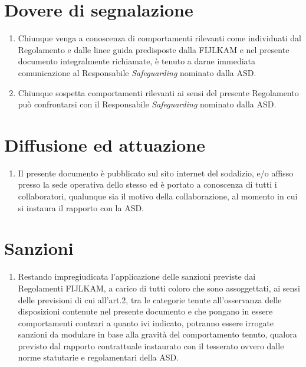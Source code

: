\documentclass{djtsdoc}
\begin{document}
	\section{Dovere di segnalazione}
	\begin{enumerate}
		\item Chiunque venga a conoscenza di comportamenti rilevanti come individuati dal Regolamento e dalle linee guida predisposte dalla FIJLKAM e nel presente documento integralmente richiamate, è tenuto a darne immediata comunicazione al Responsabile \textit{Safeguarding} nominato dalla ASD.
		\item Chiunque sospetta comportamenti rilevanti ai sensi del presente Regolamento può confrontarsi con il Responsabile \textit{Safeguarding} nominato dalla ASD.
	\end{enumerate}
	
	\section{Diffusione ed attuazione}
	\begin{enumerate}
		\item Il presente documento è pubblicato sul sito internet del sodalizio, e/o affisso presso la sede operativa dello stesso ed è portato a conoscenza di tutti i collaboratori, qualunque sia il motivo della collaborazione, al momento in cui si instaura il rapporto con la ASD.
	\end{enumerate}
	
	\section{Sanzioni}
	\begin{enumerate}
		\item Restando impregiudicata l'applicazione delle sanzioni previste dai Regolamenti FIJLKAM, a carico di tutti coloro che sono assoggettati, ai sensi delle previsioni di cui all'art.2, tra le categorie tenute all'osservanza delle disposizioni contenute nel presente documento e che pongano in essere comportamenti contrari a quanto ivi indicato, potranno essere irrogate sanzioni da modulare in base alla gravità del comportamento tenuto, qualora previsto dal rapporto contrattuale instaurato con il tesserato ovvero dalle norme statutarie e regolamentari della ASD.
	\end{enumerate}
	
\end{document}
